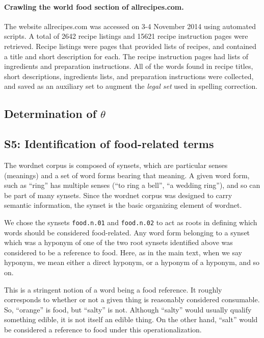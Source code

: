 \documentclass[12pt]{article}
\begin{document}
	\paragraph{Crawling the world food section of allrecipes.com.}
	The website allrecipes.com was accessed on 3-4 November 2014 using 
	automated scripts.  A total of 2642 recipe listings and 15621 recipe
	instruction pages were retrieved.  Recipe listings were pages that 
	provided lists of recipes, and contained a title and short description 
	for each.  
	The recipe instruction pages had lists of ingredients and preparation 
	instructions.  All of the words found in recipe titles, short
	descriptions, ingredients lists, and preparation instructions were
	collected, and saved as an auxiliary set to augment the \textit{legal set}
	used in spelling correction.
	


\subsection*{Determination of $\theta$}

\subsection*{S5: Identification of food-related terms}
The wordnet corpus is composed of synsets, which are particular senses 
(meanings) and a set of word forms bearing that meaning. A given word form, 
such as ``ring'' has multiple senses (``to ring a bell'', ``a wedding ring''), 
and so can be part of many synsets.  Since the wordnet corpus was designed
to carry semantic information, the synset is the basic organizing element
of wordnet.

We chose the synsets \texttt{food.n.01} and \texttt{food.n.02} to act as roots
in defining which words should be considered food-related.  Any word form
belonging to a synset which was a hyponym of one of the two root synsets
identified above was considered to be a reference to food.  Here, as in the
main text, when we say hyponym, we mean either a direct hyponym, or a hyponym
of a hyponym, and so on.

This is a stringent notion of a word being a food reference.  It roughly
corresponds to whether or not a given thing is reasonably considered 
consumable.  So, ``orange'' is food, but ``salty'' is not.  Although ``salty''
would usually qualify something edible, it is not itself an edible thing.
On the other hand, ``salt'' would be considered a reference to food under 
this operationalization.
\end{document}
